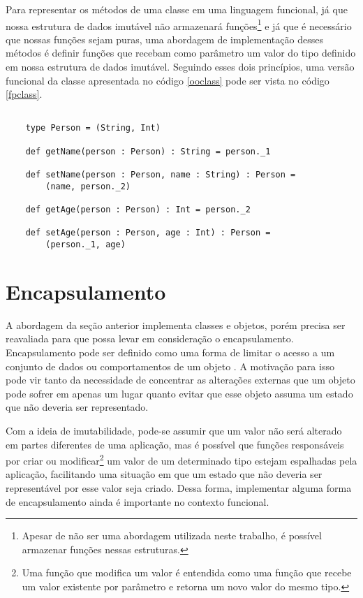 Para representar os métodos de uma classe em uma 
linguagem funcional, já que nossa estrutura de dados 
imutável não armazenará funções\footnote{Apesar de não 
ser uma abordagem utilizada neste trabalho, é 
possível armazenar funções nessas estruturas.} e já 
que é necessário que nossas funções sejam puras, 
uma abordagem de implementação desses 
métodos é definir funções que recebam 
como parâmetro um valor do tipo definido em nossa 
estrutura de dados imutável. Seguindo esses dois 
princípios, uma versão funcional da classe apresentada 
no código \ref{ooclass} pode ser vista no código \ref{fpclass}.


\begin{lstlisting}[caption={Representação de uma classe no contexto funcional},label=fpclass]
    
    type Person = (String, Int)

    def getName(person : Person) : String = person._1 

    def setName(person : Person, name : String) : Person = 
        (name, person._2)

    def getAge(person : Person) : Int = person._2

    def setAge(person : Person, age : Int) : Person =
        (person._1, age)

\end{lstlisting}

\section{Encapsulamento}

A abordagem da seção anterior implementa 
classes e objetos, porém precisa ser 
reavaliada para que possa levar em consideração 
o encapsulamento. Encapsulamento pode ser definido 
como uma forma de limitar o acesso a um conjunto 
de dados ou comportamentos de um objeto \cite{quarkoo}. 
A motivação para isso pode vir tanto da necessidade 
de concentrar as alterações externas que um objeto 
pode sofrer em apenas um lugar quanto evitar que 
esse objeto assuma um estado que não deveria ser 
representado. 

Com a ideia de imutabilidade, pode-se 
assumir que um valor não será alterado em partes 
diferentes de uma aplicação, mas é possível 
que funções responsáveis por criar ou modificar\footnote{
    Uma função que modifica um valor é entendida 
    como uma função que recebe um valor existente 
    por parâmetro e retorna um novo valor do mesmo 
    tipo.
} 
um valor de um determinado tipo estejam 
espalhadas pela aplicação, facilitando uma 
situação em que um estado que não deveria ser 
representável por esse valor seja criado. 
Dessa forma, implementar alguma forma de 
encapsulamento ainda é importante no 
contexto funcional.

